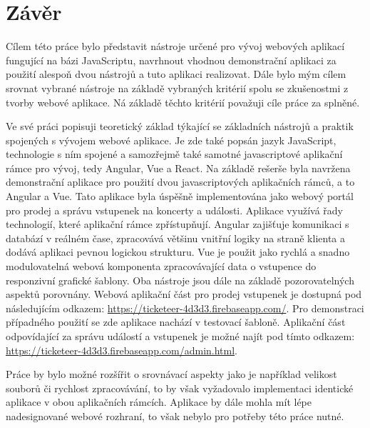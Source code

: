 \chapter{Závěr}
Cílem této práce bylo představit nástroje určené pro vývoj webových aplikací fungující na bázi JavaScriptu, navrhnout vhodnou demonstrační aplikaci za použití alespoň dvou nástrojů a tuto aplikaci realizovat. Dále bylo mým cílem srovnat vybrané nástroje na základě vybraných kritérií spolu se zkušenostmi z tvorby webové aplikace. Ná základě těchto kritérií považuji cíle práce za splněné.

Ve své práci popisuji teoretický základ týkající se základních nástrojů a praktik spojených s vývojem webové aplikace. Je zde také popsán jazyk JavaScript, technologie s ním spojené a samozřejmě také samotné javascriptové aplikační rámce pro vývoj, tedy Angular, Vue a React. Na základě rešerše byla navržena demonstrační aplikace pro použití dvou javascriptových aplikačních rámců, a to Angular a Vue. Tato aplikace byla úspěšně implementována jako webový portál pro prodej a správu vstupenek na koncerty a události. Aplikace využívá řady technologií, které aplikační rámce zpřístupňují. Angular zajišťuje komunikaci s databází v reálném čase, zpracovává většinu vnitřní logiky na straně klienta a dodává aplikaci pevnou logickou strukturu. Vue je použit jako rychlá a snadno modulovatelná webová komponenta zpracovávající data o vstupence do responzivní grafické šablony. Oba nástroje jsou dále na základě pozorovatelných aspektů porovnány.
Webová aplikační část pro prodej vstupenek je dostupná pod následujícím odkazem: \url{https://ticketeer-4d3d3.firebaseapp.com/}. Pro demonstraci případného použití se zde aplikace nachází v testovací šabloně. Aplikační část odpovídající za správu událostí a vstupenek je možné najít pod tímto odkazem: \url{https://ticketeer-4d3d3.firebaseapp.com/admin.html}. 

Práce by bylo možné rozšířit o srovnávací aspekty jako je například velikost souborů či rychlost zpracovávání, to by však vyžadovalo implementaci identické aplikace v obou aplikačních rámcích. Aplikace by dále mohla mít lépe nadesignované webové rozhraní, to však nebylo pro potřeby této práce nutné.
